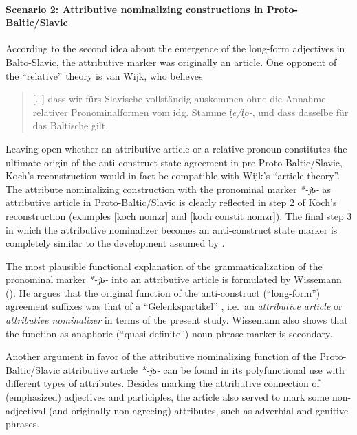 \paragraph{Scenario 2: Attributive nominalizing constructions in Proto-Baltic/Slavic} 
According to the second idea about the emergence of the long-form adjectives in Balto-Slavic, the attributive marker was originally an article. One opponent of the “relative” theory is van Wijk, who believes 
\begin{quote}
[\dots] dass wir fürs Slavische vollständig auskommen ohne die Annahme relativer Pronominalformen vom idg. Stamme \textit{i̭e/i̭o-}, und dass dasselbe für das Baltische gilt. \citep[28]{wijk1935}
\end{quote}
Leaving open whether an attributive article or a relative pronoun constitutes the ultimate origin of the anti-construct state agreement in pre-Proto-Baltic/Slavic, Koch's reconstruction would in fact be compatible with Wijk's “article theory”. The attribute nominalizing construction with the pronominal marker \textit{*-jь-} as attributive article in Proto-Baltic/Slavic is clearly reflected in step 2 of Koch's reconstruction (examples \ref{koch nomzr} and \ref{koch constit nomzr}). The final step 3 in which the attributive nominalizer becomes an anti-construct state marker is completely similar to the development assumed by \cite{wijk1935}.

The most plausible functional explanation of the grammaticalization of the pronominal marker \textit{*-jь-} into an attributive article is formulated by Wissemann (\citeyear{wissemann1958}). He argues that the original function of the anti-construct (“long-form”) agreement suffixes was that of a “Gelenkspartikel” \citep[76]{wissemann1958}, i.e.~an \textit{attributive article} or \textit{attributive nominalizer} in terms of the present study. Wissemann also shows that the function as anaphoric (“quasi-definite”) noun phrase marker is secondary.

Another argument in favor of the attributive nominalizing function of the Proto-Baltic/Slavic attributive article \textit{*-jь-} can be found in its polyfunctional use with different types of attributes. Besides marking the attributive connection of (emphasized) adjectives and participles, the article also served to mark some non-adjectival (and originally non-agreeing) attributes, such as adverbial and genitive phrases.

